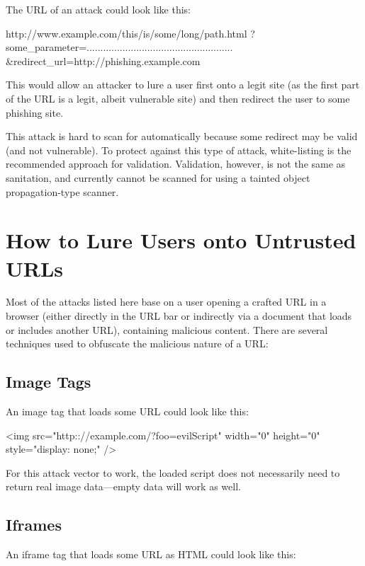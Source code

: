 
The URL of an attack could look like this:

\begin{textcode}
http://www.example.com/this/is/some/long/path.html
  ?some_parameter=.....................................................
  &redirect_url=http://phishing.example.com
\end{textcode}

This would allow an attacker to lure a user first onto a legit site (as the first part of the URL is a legit, albeit vulnerable site) and then redirect the user to some phishing site.

This attack is hard to scan for automatically because some redirect may be valid (and not vulnerable). To protect against this type of attack, white-listing is the recommended approach for validation. Validation, however, is not the same as sanitation, and currently cannot be scanned for using a tainted object propagation-type scanner.


\section{How to Lure Users onto Untrusted URLs}
Most of the attacks listed here base on a user opening a crafted URL in a browser (either directly in the URL bar or indirectly via a document that loads or includes another URL), containing malicious content. There are several techniques used to obfuscate the malicious nature of a URL:

\subsection{Image Tags}
An image tag that loads some URL could look like this:

\begin{htmlcode}
<img src="http:://example.com/?foo=evilScript"
  width="0" height="0" style="display: none;" />
\end{htmlcode}

For this attack vector to work, the loaded script does not necessarily need to return real image data---empty data will work as well.


\subsection{Iframes}
An iframe tag that loads some URL as HTML could look like this:


